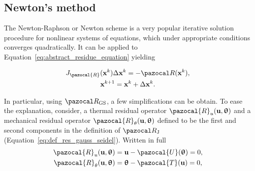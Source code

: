 \subsection{Newton's method}

The Newton-Raphson or Newton scheme is a very popular iterative solution procedure for nonlinear systems of equations, which under appropriate conditions converges quadratically.
It can be applied to Equation~\eqref{eq:abstract_residue_equation} yielding
\begin{highlight}[innertopmargin=-5pt]
  \begin{gather}
    J_\pazocal{R}(\mathbf x^k)\Delta \mathbf x^k = - \pazocal R(\mathbf x^k),\\
    \mathbf x^{k+1} = \mathbf x^k + \Delta \mathbf x^k.
  \end{gather}
\end{highlight}

In particular, using \(\pazocal R_\mathrm{GS}\), a few simplifications can be obtain. 
To ease the explanation, consider, a thermal residual operator $\pazocal{R}_{u}(\mathbf{u}, \bm{\uptheta})$ and a mechanical residual operator $\pazocal{R}_{\theta}(\mathbf{u}, \bm{\uptheta})$ defined to be the first and second components in the definition of \(\pazocal R_\mathrm{J}\) (Equation~\eqref{eq:def_res_gauss_seidel}).
Written in full
\begin{gather}
\pazocal{R}_{u}(\mathbf{u}, \bm{\uptheta})=\mathbf{u}-\pazocal{U}(\bm{\uptheta})=0, \\
\pazocal{R}_{\theta}(\mathbf{u}, \bm{\uptheta})=\bm{\uptheta}-\pazocal{T}(\mathbf{u})=0,
\end{gather}

